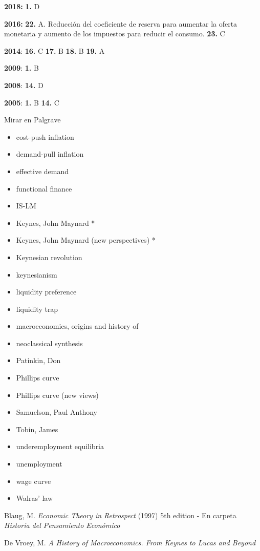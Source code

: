 \documentclass{nuevotema}
\begin{document}
\textbf{2018:} \textbf{1.} D

\textbf{2016:} \textbf{22.} A. Reducción del coeficiente de reserva para aumentar la oferta monetaria y aumento de los impuestos para reducir el consumo. \textbf{23.} C

\textbf{2014}: \textbf{16.} C \textbf{17.} B \textbf{18.} B \textbf{19.} A

\textbf{2009}: \textbf{1.} B

\textbf{2008}: \textbf{14.} D

\textbf{2005}: \textbf{1.} B \textbf{14.} C

\bibliografia

Mirar en Palgrave
\begin{itemize}
	\item cost-push inflation
	\item demand-pull inflation
	\item effective demand
	\item functional finance
	\item IS-LM
	\item Keynes, John Maynard *
	\item Keynes, John Maynard (new perspectives) *
	\item Keynesian revolution
	\item keynesianism
	\item liquidity preference
	\item liquidity trap
	\item macroeconomics, origins and history of
	\item neoclassical synthesis
	\item Patinkin, Don
	\item Phillips curve
	\item Phillips curve (new views)
	\item Samuelson, Paul Anthony
	\item Tobin, James
	\item underemployment equilibria
	\item unemployment
	\item wage curve
	\item Walras' law
\end{itemize}



Blaug, M. \textit{Economic Theory in Retrospect} (1997) 5th edition - En carpeta \textit{Historia del Pensamiento Económico}

De Vroey, M. \textit{A History of Macroeconomics. From Keynes to Lucas and Beyond}
\end{document}
